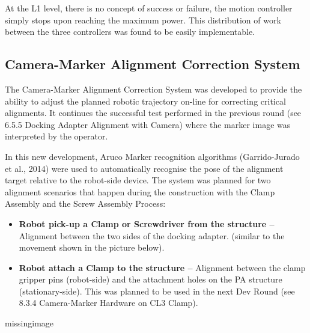 At the L1 level, there is no concept of success or failure, the motion controller simply stops upon reaching the maximum power. This distribution of work between the three controllers was found to be easily implementable.

\subsection{Camera-Marker Alignment Correction System}
The Camera-Marker Alignment Correction System was developed to provide the ability to adjust the planned robotic trajectory on-line for correcting critical alignments. It continues the successful test performed in the previous round (see 6.5.5 Docking Adapter Alignment with Camera) where the marker image was interpreted by the operator. 

In this new development, Aruco Marker recognition algorithms (Garrido-Jurado et al., 2014) were used to automatically recognise the pose of the alignment target relative to the robot-side device. The system was planned for two alignment scenarios that happen during the construction with the Clamp Assembly and the Screw Assembly Process:

\begin{itemize}
    \item \textbf{Robot pick-up a Clamp or Screwdriver from the structure --} Alignment between the two sides of the docking adapter. (similar to the movement shown in the picture below).
    \item \textbf{Robot attach a Clamp to the structure --} Alignment between the clamp gripper pins (robot-side) and the attachment holes on the PA structure (stationary-side). This was planned to be used in the next Dev Round (see 8.3.4 Camera-Marker Hardware on CL3 Clamp).
\end{itemize}

missingimage

